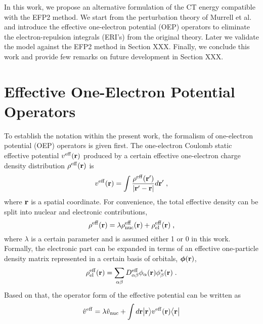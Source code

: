 In this work, we propose an alternative formulation of the CT energy compatible with the
EFP2 method. We start from the perturbation theory of Murrell et al.
and
introduce the effective one\hyp{}electron potential (OEP) operators
to eliminate the electron\hyp{}repulsion integrals (ERI's) from the original theory.
Later we validate the model against the EFP2 method in Section XXX. Finally,
we conclude this work and provide few remarks on future development in Section XXX.

\section{\label{s:2}Effective One-Electron Potential Operators}

To establish the notation within the present work, 
the formalism of one\hyp{}electron potential (OEP) operators is
given first.
The one\hyp{}electron Coulomb static effective potential $v^{\rm eff}({\bf r})$
produced by a certain effective one\hyp{}electron charge density distribution $\rho^{\rm eff}({\bf r})$
is 
%
\begin{equation} \label{e:v-eff}
	v^{\rm eff}({\bf r}) = \int \frac{ \rho^{\rm eff}({\bf r}') }{ \vert {\bf r}' - {\bf r} \vert} d{\bf r}' \;,
\end{equation}
%
where ${\bf r}$ is a spatial coordinate. 
For convenience, the total effective density can be split into nuclear and electronic contributions,
%
\begin{equation} \label{e:rho-eff}
 \rho^{\rm eff}({\bf r}) = \lambda \rho^{\rm eff}_{\rm nuc}({\bf r}) + \rho^{\rm eff}_{\rm el}({\bf r}) \;,
\end{equation}
%
where $\lambda$ is a certain parameter and is assumed either 1 or 0 in this work.
Formally, the electronic part can be expanded in terms of an effective
one\hyp{}particle density matrix represented in a certain basis of orbitals, $\BM{\phi}({\bf r})$,
%
\begin{equation} \label{e:d-spectral}
	\rho^{\rm eff}_{\rm el}({\bf r}) = \sum_{\alpha\beta} D_{\alpha\beta}^{\rm eff} 
	\phi_\alpha({\bf r}) \phi_\beta^{*}({\bf r})  \;.
\end{equation}
%
Based on that, the operator form of the effective potential 
can be written as
%
\begin{equation} \label{e:oep-operator}
	\hat{v}^{\rm eff} = 
        \lambda \hat{v}_{\rm nuc} +
        \int d{\bf r} \Ket{{\bf r}} 
        v^{\rm eff}({\bf r})
        \Bra{{\bf r}}
\end{equation}

